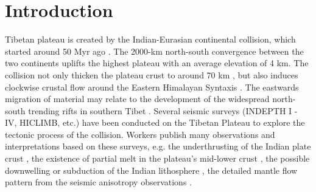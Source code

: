 \section{Introduction}

Tibetan plateau is created by the Indian-Eurasian continental collision, which started around 50 Myr ago \cite{Patriat_1984}. The 2000-km north-south convergence between the two continents uplifts the highest plateau with an average elevation of 4 km. The collision not only thicken the plateau crust to around 70 km \cite[e.g.][]{Nabelek_2009}, but also induces clockwise crustal flow around the Eastern Himalayan Syntaxis \cite{Gan_2007}. The eastwards migration of material may relate to the development of the widespread north-south trending rifts in southern Tibet \cite[e.g.][]{Yin_2000,Zhang_2013}. 
Several seismic surveys (INDEPTH I - IV, HICLIMB, etc.) have been conducted on the Tibetan Plateau to explore the tectonic process of the collision. Workers publish many observations and interpretations based on these surveys, e.g. the underthrusting of the Indian plate crust \cite{Zhao_1993}, the existence of partial melt in the plateau’s mid-lower crust \cite{Brown_1996}, the possible downwelling or subduction of the Indian lithosphere \cite[e.g.][]{Tilmann_2003,Li_2008,Nabelek_2009}, the detailed mantle flow pattern from the seismic anisotropy observations \cite[e.g.][]{Hirn_1995,Huang_2000,Fu_2008}.


